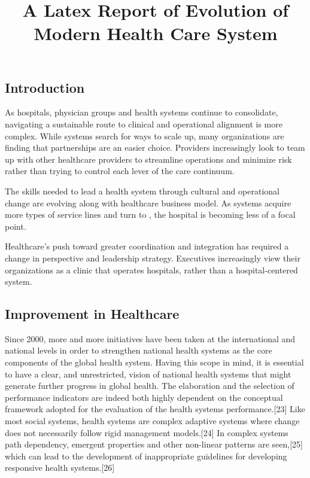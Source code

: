 \documentclass[12pt]{article}
\begin{document}
\title{A Latex Report of Evolution of Modern Health Care System}
\maketitle

\subsection{Introduction}
As hospitals, physician groups and health systems continue to consolidate, navigating a sustainable route to clinical and operational alignment is more complex. While systems search for ways to scale up, many organizations are finding that partnerships are an easier choice. Providers increasingly look to team up with other healthcare providers to streamline operations and minimize risk rather than trying to control each lever of the care continuum.

The skills needed to lead a health system through cultural and operational change are evolving along with healthcare business model. As systems acquire more types of service lines and turn to , the hospital is becoming less of a focal point.

Healthcare's push toward greater coordination and integration has required a change in perspective and leadership strategy. Executives increasingly view their organizations as a clinic that operates hospitals, rather than a hospital-centered system.

\subsection{Improvement in Healthcare}
Since 2000, more and more initiatives have been taken at the international and national levels in order to strengthen national health systems as the core components of the global health system. Having this scope in mind, it is essential to have a clear, and unrestricted, vision of national health systems that might generate further progress in global health. The elaboration and the selection of performance indicators are indeed both highly dependent on the conceptual framework adopted for the evaluation of the health systems performance.[23] Like most social systems, health systems are complex adaptive systems where change does not necessarily follow rigid management models.[24] In complex systems path dependency, emergent properties and other non-linear patterns are seen,[25] which can lead to the development of inappropriate guidelines for developing responsive health systems.[26]
\end{document}
